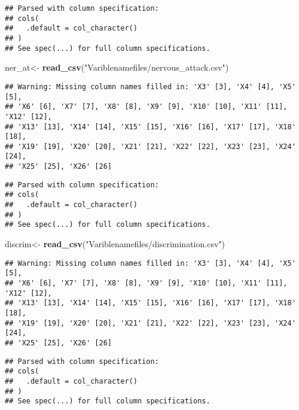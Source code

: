 \documentclass[]{article}
\newenvironment{Shaded}{\begin{snugshade}}{\end{snugshade}}
\newcommand{\KeywordTok}[1]{\textcolor[rgb]{0.13,0.29,0.53}{\textbf{#1}}}
\newcommand{\StringTok}[1]{\textcolor[rgb]{0.31,0.60,0.02}{#1}}
\newcommand{\NormalTok}[1]{#1}
\begin{document}
\begin{verbatim}
## Parsed with column specification:
## cols(
##   .default = col_character()
## )
## See spec(...) for full column specifications.
\end{verbatim}

\begin{Shaded}
\begin{Highlighting}[]
\NormalTok{ner_at<-}\StringTok{ }\KeywordTok{read_csv}\NormalTok{(}\StringTok{"Variblenamefiles/nervous_attack.csv"}\NormalTok{)}
\end{Highlighting}
\end{Shaded}

\begin{verbatim}
## Warning: Missing column names filled in: 'X3' [3], 'X4' [4], 'X5' [5],
## 'X6' [6], 'X7' [7], 'X8' [8], 'X9' [9], 'X10' [10], 'X11' [11], 'X12' [12],
## 'X13' [13], 'X14' [14], 'X15' [15], 'X16' [16], 'X17' [17], 'X18' [18],
## 'X19' [19], 'X20' [20], 'X21' [21], 'X22' [22], 'X23' [23], 'X24' [24],
## 'X25' [25], 'X26' [26]
\end{verbatim}

\begin{verbatim}
## Parsed with column specification:
## cols(
##   .default = col_character()
## )
## See spec(...) for full column specifications.
\end{verbatim}

\begin{Shaded}
\begin{Highlighting}[]
\NormalTok{discrim<-}\StringTok{ }\KeywordTok{read_csv}\NormalTok{(}\StringTok{"Variblenamefiles/discrimination.csv"}\NormalTok{)}
\end{Highlighting}
\end{Shaded}

\begin{verbatim}
## Warning: Missing column names filled in: 'X3' [3], 'X4' [4], 'X5' [5],
## 'X6' [6], 'X7' [7], 'X8' [8], 'X9' [9], 'X10' [10], 'X11' [11], 'X12' [12],
## 'X13' [13], 'X14' [14], 'X15' [15], 'X16' [16], 'X17' [17], 'X18' [18],
## 'X19' [19], 'X20' [20], 'X21' [21], 'X22' [22], 'X23' [23], 'X24' [24],
## 'X25' [25], 'X26' [26]
\end{verbatim}

\begin{verbatim}
## Parsed with column specification:
## cols(
##   .default = col_character()
## )
## See spec(...) for full column specifications.
\end{verbatim}
\end{document}
